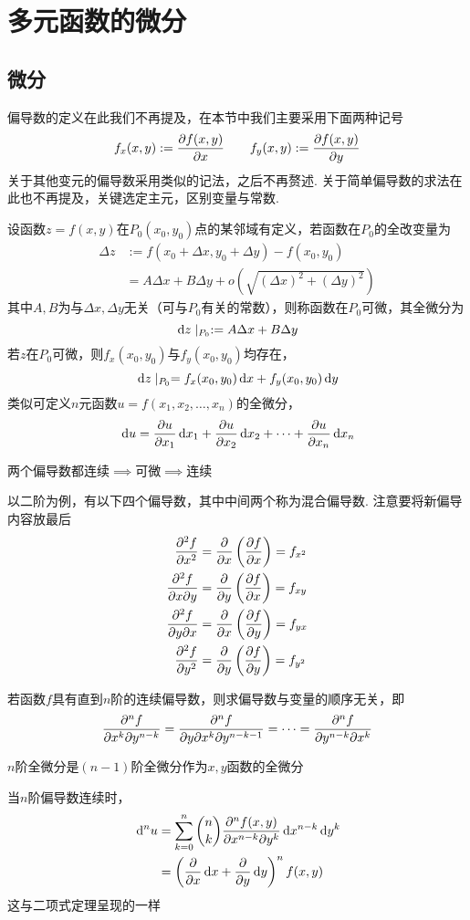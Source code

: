 
\section{多元函数的微分}
\subsection{微分}
偏导数的定义在此我们不再提及，在本节中我们主要采用下面两种记号
\[f_x(x,y):=\dfrac{\partial f(x,y)}{\partial x}\qquad f_y(x,y):=\dfrac{\partial f(x,y)}{\partial y}\]
关于其他变元的偏导数采用类似的记法，之后不再赘述.
关于简单偏导数的求法在此也不再提及，关键选定主元，区别变量与常数.
\begin{definition}[全微分]
设函数$z=f(x,y)$在$P_0(x_0,y_0)$点的某邻域有定义，若函数在$P_0$的全改变量为
\[\begin{aligned}
\Delta z&:=f(x_0+\Delta x,y_0+\Delta y)-f(x_0,y_0)\\
&=A\Delta x+B\Delta y+o(\sqrt{(\Delta x)^2+(\Delta y)^2})
\end{aligned}\]
其中$A,B$为与$\Delta x,\Delta y$无关（可与$P_0$有关的常数），则称函数在$P_0$可微，其全微分为
\[\,\mathrm{d} z\mid_{P_0}:=A\Delta x+B\Delta y\]
若$z$在$P_0$可微，则$f_x(x_0,y_0)$与$f_y(x_0,y_0)$均存在，
\[\,\mathrm{d} z\mid_{P_0}=f_x(x_0,y_0)\,\mathrm{d} x+f_y(x_0,y_0)\,\mathrm{d} y\]
类似可定义$n$元函数$u=f(x_1,x_2,\ldots,x_n)$的全微分，
\[\,\mathrm{d} u=\dfrac{\partial u}{\partial x_1}\,\mathrm{d} x_1+\dfrac{\partial u}{\partial x_2}\,\mathrm{d} x_2+\cdots+\dfrac{\partial u}{\partial x_n}\,\mathrm{d} x_n\]
\end{definition}
\begin{theorem}
两个偏导数都连续$\implies$可微$\implies$连续
\end{theorem}
\begin{definition}[高阶偏导数]
以二阶为例，有以下四个偏导数，其中中间两个称为混合偏导数. 注意要将新偏导内容放最后
\[\begin{aligned}
\dfrac{\partial^2 f}{\partial x^2}&=\dfrac{\partial }{\partial x}\left(\dfrac{\partial f}{\partial x}\right)=f_{x^2}\\
\dfrac{\partial^2 f}{\partial x\partial y}&=\dfrac{\partial }{\partial y}\left(\dfrac{\partial f}{\partial x}\right)=f_{xy}\\
\dfrac{\partial^2 f}{\partial y\partial x}&=\dfrac{\partial }{\partial x}\left(\dfrac{\partial f}{\partial y}\right)=f_{yx}\\
\dfrac{\partial^2 f}{\partial y^2}&=\dfrac{\partial }{\partial y}\left(\dfrac{\partial f}{\partial y}\right)=f_{y^2}
\end{aligned}\]
\end{definition}
\begin{theorem}[混合偏导数相等]
若函数$f$具有直到$n$阶的连续偏导数，则求偏导数与变量的顺序无关，即
\[\dfrac{\partial^n f}{\partial x^k\partial y^{n-k}}=\dfrac{\partial^n f}{\partial y\partial x^k\partial y^{n-k-1}}=\cdots=\dfrac{\partial^n f}{\partial y^{n-k}\partial x^{k}}\]
\end{theorem}
$n$阶全微分是$(n-1)$阶全微分作为$x,y$函数的全微分
\begin{theorem}[高阶全微分]
当$n$阶偏导数连续时，
\[\begin{aligned}
\,\mathrm{d}^n u&=\sum_{k=0}^n\binom{n}{k}\dfrac{\partial^n f(x,y)}{\partial x^{n-k}\partial y^k}\,\mathrm{d} x^{n-k}\,\mathrm{d} y^k\\
&=\left(\dfrac{\partial }{\partial x}\,\mathrm{d} x+\dfrac{\partial }{\partial y}\,\mathrm{d} y\right)^n f(x,y)
\end{aligned}\]
这与二项式定理呈现的一样
\end{theorem}

